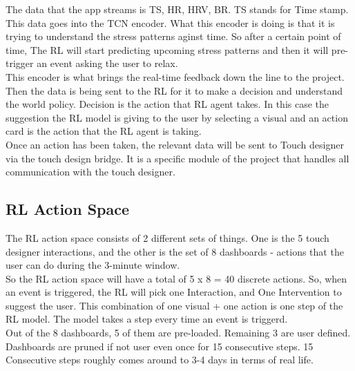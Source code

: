 \documentclass[
	fontsize=15pt,
	twoside=false,
	secnumdepth=2
]{kaobook}
\begin{document}
\begin{figure}[!htbp]
{%
}
\end{figure}

The data that the app streams is TS, HR, HRV, BR. TS stands for Time stamp. This data goes into the TCN encoder. What this encoder is doing is that it is trying to understand the stress patterns aginst time. So after a certain point of time, The RL will start predicting upcoming stress patterns and then it will pre-trigger an event asking the user to relax. \\

This encoder is what brings the real-time feedback down the line to the project. \\


Then the data is being sent to the RL for it to make a decision and understand the world policy. Decision is the action that RL agent takes. In this case the suggestion the RL model is giving to the user by selecting a visual and an action card is the action that the RL agent is taking. \\

Once an action has been taken, the relevant data will be sent to Touch designer via the touch design bridge. It is a specific module of the project that handles all communication with the touch designer.\\


\subsection{RL Action Space}
The RL action space consists of 2 different sets of things. One is the 5 touch designer interactions, and the other is the set of 8 dashboards - actions that the user can do during the 3-minute window. \\ 

So the RL action space will have a total of 5 x 8 = 40 discrete actions. So, when an event is triggered, the RL will pick one Interaction, and One Intervention to suggest the user. This combination of one visual + one action is one step of the RL model. The model takes a step every time an event is triggerd. \\

Out of the 8 dashboards, 5 of them are pre-loaded. Remaining 3 are user defined. Dashboards are pruned if not user even once for 15 consecutive steps. 15 Consecutive steps roughly comes around to 3-4 days in terms of real life. \\
\end{document}
